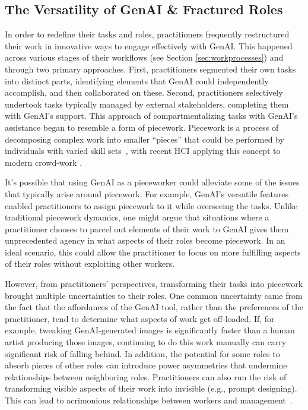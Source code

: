 \subsection{The Versatility of GenAI \& Fractured Roles}
In order to redefine their tasks and roles, practitioners frequently restructured their work in innovative ways to engage effectively with GenAI. This happened across various stages of their workflows (see Section \ref{sec:workprocesses}) and through two primary approaches. First, practitioners segmented their own tasks into distinct parts, identifying elements that GenAI could independently accomplish, and then collaborated on these. Second, practitioners selectively undertook tasks typically managed by external stakeholders, completing them with GenAI’s support. This approach of compartmentalizing tasks with GenAI’s assistance began to resemble a form of piecework\cite{hagan1973piece}. Piecework is a process of decomposing complex work into smaller ``pieces'' that could be performed by individuals with varied skill sets~\cite{alkhatib2017examining}, with recent HCI applying this concept to modern crowd-work \cite{irani2015cultural}. 

It's possible that using GenAI as a pieceworker could alleviate some of the issues that typically arise around piecework. For example, GenAI's versatile features enabled practitioners to assign piecework to it while overseeing the tasks. Unlike traditional piecework dynamics, one might argue that situations where a practitioner chooses to parcel out elements of their work to GenAI gives them unprecedented agency in what aspects of their roles become piecework. In an ideal scenario, this could allow the practitioner to focus on more fulfilling aspects of their roles without exploiting other workers.

However, from practitioners' perspectives, transforming their tasks into piecework brought multiple uncertainties to their roles. One common uncertainty came from the fact that the affordances of the GenAI tool, rather than the preferences of the practitioner, tend to determine what aspects of work get off-loaded. If, for example, tweaking GenAI-generated images is significantly faster than a human artist producing those images, continuing to do this work manually can carry significant risk of falling behind. In addition, the potential for some roles to absorb pieces of other roles can introduce power asymmetries that undermine relationships between neighboring roles. Practitioners can also run the risk of transforming visible aspects of their work into invisible (e.g., prompt designing). This can lead to acrimonious relationships between workers and management~\cite{alkhatib2017examining}.

